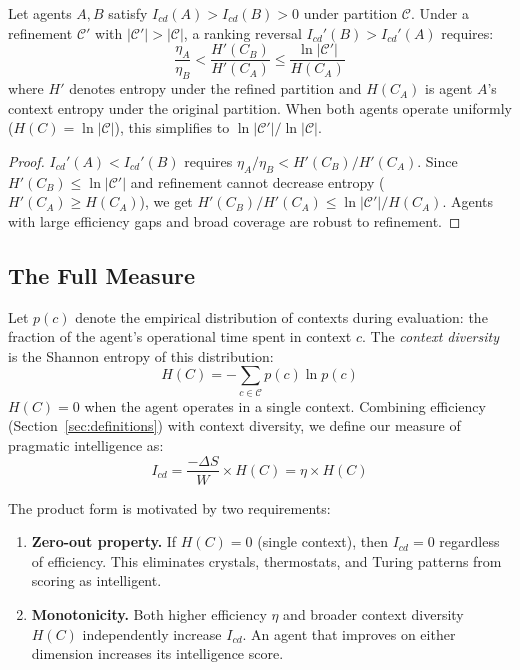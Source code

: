 \documentclass[runningheads,a4paper]{llncs}
\begin{document}
\begin{proposition}
\label{prop:reversal}
Let agents $A, B$ satisfy $I_{cd}(A) > I_{cd}(B) > 0$ under partition $\mathcal{C}$. Under a refinement $\mathcal{C}'$ with $|\mathcal{C}'| > |\mathcal{C}|$, a ranking reversal $I_{cd}'(B) > I_{cd}'(A)$ requires:
\[
\frac{\eta_A}{\eta_B} < \frac{H'(C_B)}{H'(C_A)} \leq \frac{\ln|\mathcal{C}'|}{H(C_A)}
\]
where $H'$ denotes entropy under the refined partition and $H(C_A)$ is agent $A$'s context entropy under the original partition. When both agents operate uniformly ($H(C) = \ln|\mathcal{C}|$), this simplifies to $\ln|\mathcal{C}'|/\ln|\mathcal{C}|$.
\end{proposition}
\begin{proof}
$I_{cd}'(A) < I_{cd}'(B)$ requires $\eta_A / \eta_B < H'(C_B) / H'(C_A)$. Since $H'(C_B) \leq \ln|\mathcal{C}'|$ and refinement cannot decrease entropy ($H'(C_A) \geq H(C_A)$), we get $H'(C_B)/H'(C_A) \leq \ln|\mathcal{C}'|/H(C_A)$. Agents with large efficiency gaps and broad coverage are robust to refinement.
\end{proof}

\subsection{The Full Measure}
\label{sec:full-measure}

Let $p(c)$ denote the empirical distribution of contexts during evaluation: the fraction of the agent's operational time spent in context $c$. The \emph{context diversity} is the Shannon entropy of this distribution:
\begin{equation}
H(C) = -\sum_{c \in \mathcal{C}} p(c) \ln p(c)
\end{equation}
$H(C) = 0$ when the agent operates in a single context. Combining efficiency (Section~\ref{sec:definitions}) with context diversity, we define our measure of pragmatic intelligence as:
\begin{equation}
I_{cd} = \frac{-\Delta S}{W} \times H(C) = \eta \times H(C)
\label{eq:icd}
\end{equation}

The product form is motivated by two requirements:
\begin{enumerate}
\item \textbf{Zero-out property.} If $H(C) = 0$ (single context), then $I_{cd} = 0$ regardless of efficiency. This eliminates crystals, thermostats, and Turing patterns from scoring as intelligent.
\item \textbf{Monotonicity.} Both higher efficiency $\eta$ and broader context diversity $H(C)$ independently increase $I_{cd}$. An agent that improves on either dimension increases its intelligence score.
\end{enumerate}
\end{document}
